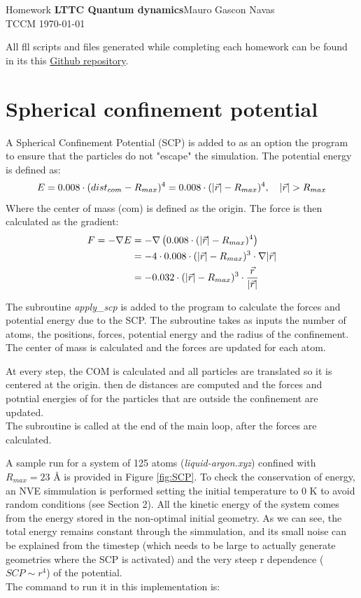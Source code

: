 \documentclass{cis320}
\begin{document}
\noindent Homework \textbf{LTTC Quantum dynamics}\hfill  Mauro Gascon Navas\\
TCCM \today

\hrulefill
\par
\vspace{1cm} 
All fll scripts and files generated while completing each homework can be found in its this \textcolor{blue}{\href{https://github.com/EliteSushi/LTTC2025/tree/main/Molecular_Dynamics}{Github repository}}.

\section{Spherical confinement potential}

A Spherical Confinement Potential (SCP) is added to as an option the program to ensure that the particles do not "escape" the simulation. The potential energy is defined as:
\[
E = 0.008 \cdot (dist_{com}-R_{max})^4 = 0.008 \cdot (\abs{\vec{r}}-R_{max})^4, \quad \abs{\vec{r}} > R_{max} 
\]
Where the center of mass (com) is defined as the origin. The force is then calculated as the gradient:
\[
\begin{aligned}
F = -\nabla E &= -\nabla \left( 0.008 \cdot (\abs{\vec{r}}-R_{max})^4 \right) \\
&= -4 \cdot 0.008 \cdot (\abs{\vec{r}}-R_{max})^3 \cdot \nabla \abs{\vec{r}} \\
&=-0.032 \cdot (\abs{\vec{r}}-R_{max})^3 \cdot \frac{\vec{r}}{\abs{\vec{r}}}
\end{aligned}
\]

The subroutine \textit{apply\_scp} is added to the program to calculate the forces and potential energy due to the SCP. The subroutine takes as inputs the number of atoms, the positions, forces, potential energy and the radius of the confinement. The center of mass is calculated and the forces are updated for each atom.\\
\par
At every step, the COM is calculated and all particles are translated so it is centered at the origin. then de distances are computed and the forces and potntial energies of for the particles that are outside the confinement are updated.\\
The subroutine is called at the end of the main loop, after the forces are calculated.\\
\par
A sample run for a system of 125 atoms (\textit{liquid-argon.xyz}) confined with $R_{max}=23$ \r{A} is  provided in Figure \ref{fig:SCP}. To check the conservation of energy, an NVE simmulation is performed setting the initial temperature to 0 K to avoid random conditions (see Section 2). All the kinetic energy of the system comes from the energy stored in the non-optimal initial geometry. As we can see, the total energy remains constant through the simmulation, and its small noise can be explained from the timestep (which needs to be large to actually generate geometries where the SCP is activated) and the very steep r dependence ($SCP \sim r^4$) of the potential. \\
The command to run it in this implementation is:
\end{document}
